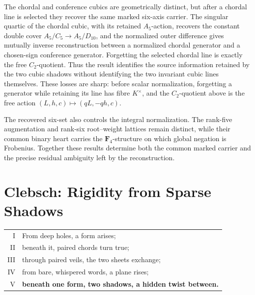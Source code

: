 \documentclass[11pt]{article}
\theoremstyle{definition}
\theoremstyle{remark}
\newcommand{\F}{\mathbf F}
\begin{document}
The chordal and conference cubics are geometrically distinct, but after a
chordal line is selected they recover the same marked six-axis carrier.  The
singular quartic of the chordal cubic, with its retained \(A_5\)-action,
recovers the constant double cover \(A_5/C_5\to A_5/D_{10}\), and the
normalized outer difference gives mutually
inverse reconstruction between a normalized chordal generator and a chosen-sign
conference generator.  Forgetting the selected chordal line is exactly the
free \(C_2\)-quotient.  Thus the result identifies the source information
retained by the two cubic shadows without identifying the two invariant cubic
lines themselves.  These losses are sharp: before scalar normalization,
forgetting a generator while retaining its line has fibre \(K^\times\), and
the \(C_2\)-quotient above is the free action
\((L,h,c)\mapsto(qL,-qh,c)\).

The recovered six-set also controls the integral normalization.  The
rank-five augmentation and rank-six root--weight lattices remain distinct,
while their common binary heart carries the \(\F_4\)-structure on which
global negation is Frobenius.  Together these results determine both the
common marked carrier and the precise residual ambiguity left by the
reconstruction.

\clearpage
\section*{Clebsch: Rigidity from Sparse Shadows}

\begin{center}
\begin{tabular}{@{}r@{\hskip 1.4em}l@{}}
{\scriptsize I}   & From deep holes, a form arises;\\
{\scriptsize II}  & beneath it, paired chords turn true;\\
{\scriptsize III} & through paired veils, the two sheets exchange;\\
{\scriptsize IV}  & from bare, whispered words, a plane rises;\\
{\scriptsize V}   & \textbf{beneath one form, two shadows, a hidden twist between.}
\end{tabular}
\end{center}
\end{document}
